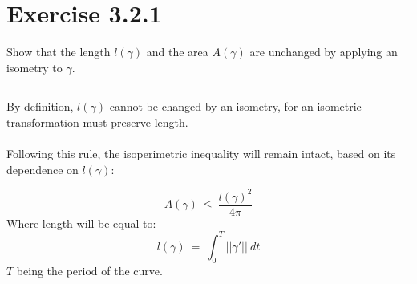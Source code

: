 \documentclass[12pt]{article}
\begin{document}
\maketitle

\section*{Exercise 3.2.1}

Show that the length $l(\gamma)$ and the area $A(\gamma)$ are unchanged by applying an isometry to $\gamma$.

\vspace{1cm}
\hrule
\vspace{1cm}

By definition, $l(\gamma)$ cannot be changed by an isometry, for an isometric transformation must preserve length.\\\\
\indent
Following this rule, the isoperimetric inequality will remain intact, based on its dependence on $l(\gamma)$:

$$
A(\gamma) \ \leq \ \frac{l(\gamma)^2}{4\pi}
$$
Where length will be equal to:
$$
l(\gamma) \ = \ \int_{0}^{T} ||\gamma'|| \ dt
$$
$T$ being the period of the curve.
\end{document}
